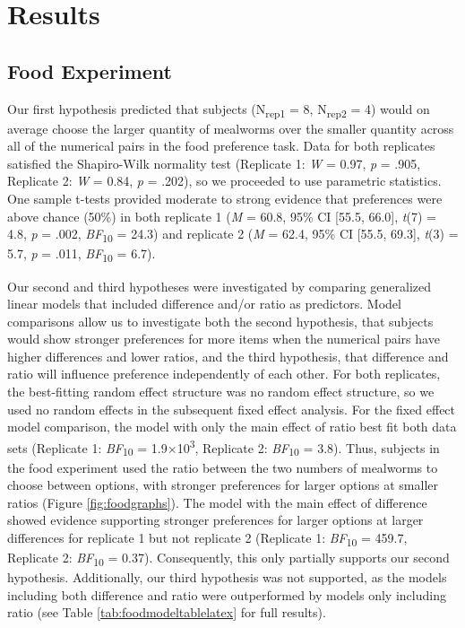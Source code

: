 \documentclass[
  ,pub,floatsintext]{apa6}
\begin{document}
\hypertarget{results}{%
\section{Results}\label{results}}

\hypertarget{food-experiment-1}{%
\subsection{Food Experiment}\label{food-experiment-1}}

Our first hypothesis predicted that subjects (N\textsubscript{rep1} = 8, N\textsubscript{rep2} = 4) would on average choose the larger quantity of mealworms over the smaller quantity across all of the numerical pairs in the food preference task. Data for both replicates satisfied the Shapiro-Wilk normality test (Replicate 1: \emph{W} = 0.97, \emph{p} = .905, Replicate 2: \emph{W} = 0.84, \emph{p} = .202), so we proceeded to use parametric statistics. One sample t-tests provided moderate to strong evidence that preferences were above chance (50\%) in both replicate 1 (\emph{M} = 60.8, 95\% CI {[}55.5, 66.0{]}, \emph{t}(7) = 4.8, \emph{p} = .002, \emph{BF}\textsubscript{10} = 24.3) and replicate 2 (\emph{M} = 62.4, 95\% CI {[}55.5, 69.3{]}, \emph{t}(3) = 5.7, \emph{p} = .011, \emph{BF}\textsubscript{10} = 6.7).

Our second and third hypotheses were investigated by comparing generalized linear models that included difference and/or ratio as predictors. Model comparisons allow us to investigate both the second hypothesis, that subjects would show stronger preferences for more items when the numerical pairs have higher differences and lower ratios, and the third hypothesis, that difference and ratio will influence preference independently of each other. For both replicates, the best-fitting random effect structure was no random effect structure, so we used no random effects in the subsequent fixed effect analysis. For the fixed effect model comparison, the model with only the main effect of ratio best fit both data sets (Replicate 1: \emph{BF}\textsubscript{10} = 1.9×10\textsuperscript{3}, Replicate 2: \emph{BF}\textsubscript{10} = 3.8). Thus, subjects in the food experiment used the ratio between the two numbers of mealworms to choose between options, with stronger preferences for larger options at smaller ratios (Figure \ref{fig:foodgraphs}). The model with the main effect of difference showed evidence supporting stronger preferences for larger options at larger differences for replicate 1 but not replicate 2 (Replicate 1: \emph{BF}\textsubscript{10} = 459.7, Replicate 2: \emph{BF}\textsubscript{10} = 0.37). Consequently, this only partially supports our second hypothesis. Additionally, our third hypothesis was not supported, as the models including both difference and ratio were outperformed by models only including ratio (see Table \ref{tab:foodmodeltablelatex} for full results).
\end{document}
